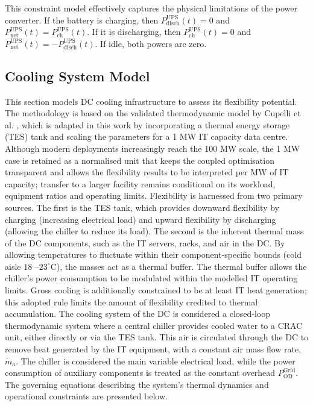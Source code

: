 \documentclass[lettersize,journal]{IEEEtran}
\providecommand{\DIFadd}[1]{{\color{blue}#1}}
\providecommand{\DIFaddbegin}{}
\providecommand{\DIFaddend}{}
\begin{document}
This constraint model effectively captures the physical limitations of the power converter. If the battery is charging, then $P^{\mathrm{UPS}}_{\mathrm{disch}}(t)=0$ and $P^{\mathrm{UPS}}_{\mathrm{net}}(t)=P^{\mathrm{UPS}}_{\mathrm{ch}}(t)$. If it is discharging, then $P^{\mathrm{UPS}}_{\mathrm{ch}}(t)=0$ and $P^{\mathrm{UPS}}_{\mathrm{net}}(t)=-P^{\mathrm{UPS}}_{\mathrm{disch}}(t)$. If idle, both powers are zero.

\subsection{Cooling System Model} \label{sec: Cooling Infrastructure Flexibility} 
This section models DC cooling infrastructure to assess its flexibility potential. The methodology is based on the validated thermodynamic model by Cupelli et al. \cite{cupelli2018data}, which is adapted in this work by incorporating a  \DIFaddbegin \DIFadd{thermal energy storage }\DIFaddend (TES) tank and scaling the parameters for a 1 MW IT capacity data centre. \DIFaddbegin \DIFadd{Although modern deployments increasingly reach the 100 MW scale, the 1 MW case is retained as a normalised unit that keeps the coupled optimisation transparent and allows the flexibility results to be interpreted per MW of IT capacity; transfer to a larger facility remains conditional on its workload, equipment ratios and operating limits.
}\DIFaddend Flexibility is harnessed from two primary sources. The \DIFaddbegin \DIFadd{first is the }\DIFaddend TES tank, which provides downward flexibility by charging (increasing electrical load) and upward flexibility by discharging (allowing the chiller to reduce its load). The second is the inherent thermal mass of the DC components, such as the IT servers, racks, and air in the DC. By allowing temperatures to fluctuate  \DIFaddbegin \DIFadd{within their component-specific bounds (cold aisle }\DIFaddend $18$ \DIFaddbegin \DIFadd{--$23^\circ$C)}\DIFaddend , the masses act as a thermal buffer. The thermal buffer allows the chiller's power consumption to be modulated  \DIFaddbegin \DIFadd{within the modelled IT operating limits. Gross cooling is additionally constrained to be at least IT heat generation; this adopted rule limits the amount of flexibility credited to thermal accumulation.
}\DIFaddend The cooling system of the DC is considered a closed-loop thermodynamic system where a central chiller provides cooled water to a CRAC unit, either directly or via the TES tank. This air is circulated through the DC to remove heat generated by the IT equipment, with a constant air mass flow rate, $\dot{m}_{a}$. The chiller is considered the main variable electrical load, while the power consumption of auxiliary components is treated as  \DIFaddbegin \DIFadd{the constant overhead $P^{\mathrm{Grid}}_{\mathrm{OD}}$}\DIFaddend . The governing equations describing the system's thermal dynamics and operational constraints are presented below.
\end{document}
